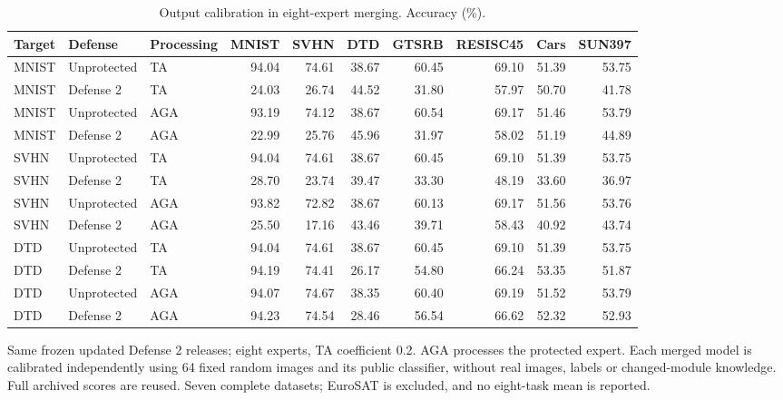 \begin{table}[t]
\centering\small
\setlength{\tabcolsep}{4pt}
\caption{Output calibration in eight-expert merging. Accuracy (\%).}
\label{tab:defense2_eight_calibration}
\begin{tabular}{@{}lllrrrrrrr@{}}
\toprule
Target & Defense & Processing & MNIST & SVHN & DTD & GTSRB & RESISC45 & Cars & SUN397 \\
\midrule
MNIST & Unprotected & TA & 94.04 & 74.61 & 38.67 & 60.45 & 69.10 & 51.39 & 53.75 \\
MNIST & Defense 2 & TA & 24.03 & 26.74 & 44.52 & 31.80 & 57.97 & 50.70 & 41.78 \\
MNIST & Unprotected & AGA & 93.19 & 74.12 & 38.67 & 60.54 & 69.17 & 51.46 & 53.79 \\
MNIST & Defense 2 & AGA & 22.99 & 25.76 & 45.96 & 31.97 & 58.02 & 51.19 & 44.89 \\
\midrule
SVHN & Unprotected & TA & 94.04 & 74.61 & 38.67 & 60.45 & 69.10 & 51.39 & 53.75 \\
SVHN & Defense 2 & TA & 28.70 & 23.74 & 39.47 & 33.30 & 48.19 & 33.60 & 36.97 \\
SVHN & Unprotected & AGA & 93.82 & 72.82 & 38.67 & 60.13 & 69.17 & 51.56 & 53.76 \\
SVHN & Defense 2 & AGA & 25.50 & 17.16 & 43.46 & 39.71 & 58.43 & 40.92 & 43.74 \\
\midrule
DTD & Unprotected & TA & 94.04 & 74.61 & 38.67 & 60.45 & 69.10 & 51.39 & 53.75 \\
DTD & Defense 2 & TA & 94.19 & 74.41 & 26.17 & 54.80 & 66.24 & 53.35 & 51.87 \\
DTD & Unprotected & AGA & 94.07 & 74.67 & 38.35 & 60.40 & 69.19 & 51.52 & 53.79 \\
DTD & Defense 2 & AGA & 94.23 & 74.54 & 28.46 & 56.54 & 66.62 & 52.32 & 52.93 \\
\bottomrule
\end{tabular}
\par\smallskip
\begin{minipage}{\textwidth}\footnotesize Same frozen updated Defense 2 releases; eight experts, TA coefficient 0.2. AGA processes the protected expert. Each merged model is calibrated independently using 64 fixed random images and its public classifier, without real images, labels or changed-module knowledge. Full archived scores are reused. Seven complete datasets; EuroSAT is excluded, and no eight-task mean is reported.\end{minipage}
\end{table}
